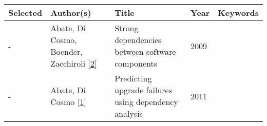 \documentclass[]{book}
\begin{document}
\begin{longtable}[]{@{}lllll@{}}
\toprule
\begin{minipage}[b]{0.01\columnwidth}\raggedright\strut
Selected\strut
\end{minipage} & \begin{minipage}[b]{0.09\columnwidth}\raggedright\strut
Author(s)\strut
\end{minipage} & \begin{minipage}[b]{0.34\columnwidth}\raggedright\strut
Title\strut
\end{minipage} & \begin{minipage}[b]{0.02\columnwidth}\raggedright\strut
Year\strut
\end{minipage} & \begin{minipage}[b]{0.39\columnwidth}\raggedright\strut
Keywords\strut
\end{minipage}\tabularnewline
\midrule
\endhead
\begin{minipage}[t]{0.01\columnwidth}\raggedright\strut
-\strut
\end{minipage} & \begin{minipage}[t]{0.09\columnwidth}\raggedright\strut
Abate, Di Cosmo, Boender, Zacchiroli
{[}\protect\hyperlink{ref-Abate2009}{2}{]}\strut
\end{minipage} & \begin{minipage}[t]{0.34\columnwidth}\raggedright\strut
Strong dependencies between software components\strut
\end{minipage} & \begin{minipage}[t]{0.02\columnwidth}\raggedright\strut
2009\strut
\end{minipage} & \begin{minipage}[t]{0.39\columnwidth}\raggedright\strut
\strut
\end{minipage}\tabularnewline
\begin{minipage}[t]{0.01\columnwidth}\raggedright\strut
-\strut
\end{minipage} & \begin{minipage}[t]{0.09\columnwidth}\raggedright\strut
Abate, Di Cosmo {[}\protect\hyperlink{ref-Abate2011}{1}{]}\strut
\end{minipage} & \begin{minipage}[t]{0.34\columnwidth}\raggedright\strut
Predicting upgrade failures using dependency analysis\strut
\end{minipage} & \begin{minipage}[t]{0.02\columnwidth}\raggedright\strut
2011\strut
\end{minipage} & \begin{minipage}[t]{0.39\columnwidth}\raggedright\strut

\end{minipage}
\end{longtable}
\end{document}
